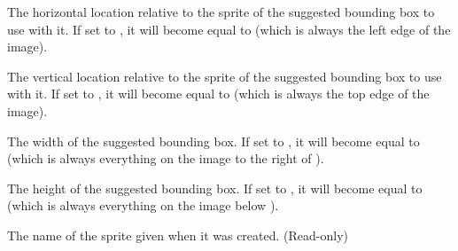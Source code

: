 \documentclass[letterpaper,10pt,english]{sphinxmanual}
\begin{document}
\begin{fulllineitems}
\begin{fulllineitems}
\end{fulllineitems}


\begin{fulllineitems}
\label{gfx:sge.gfx.Sprite.bbox_x}
The horizontal location relative to the sprite of the suggested
bounding box to use with it.  If set to , it will
become equal to  (which is always the left edge of
the image).

\end{fulllineitems}


\begin{fulllineitems}
\label{gfx:sge.gfx.Sprite.bbox_y}
The vertical location relative to the sprite of the suggested
bounding box to use with it.  If set to , it will
become equal to  (which is always the top edge of
the image).

\end{fulllineitems}


\begin{fulllineitems}
\label{gfx:sge.gfx.Sprite.bbox_width}
The width of the suggested bounding box.  If set to
, it will become equal to 
(which is always everything on the image to the right of
{\hyperref[gfx:sge.gfx.Sprite.bbox_x]{\emph{}}}).

\end{fulllineitems}


\begin{fulllineitems}
\label{gfx:sge.gfx.Sprite.bbox_height}
The height of the suggested bounding box.  If set to
, it will become equal to 
(which is always everything on the image below {\hyperref[gfx:sge.gfx.Sprite.bbox_y]{\emph{}}}).

\end{fulllineitems}


\begin{fulllineitems}
\label{gfx:sge.gfx.Sprite.name}
The name of the sprite given when it was created.  (Read-only)


\end{fulllineitems}
\end{fulllineitems}
\end{document}

